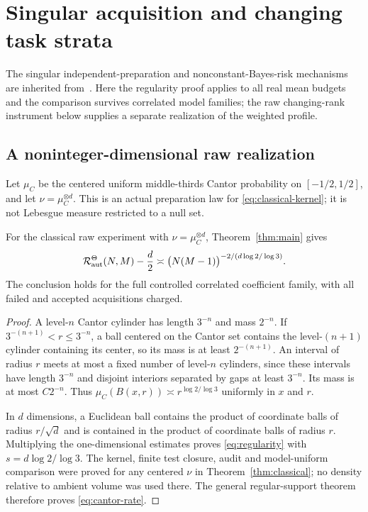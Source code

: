 \section{Singular acquisition and changing task strata}\label{sec:singular}
The singular independent-preparation and nonconstant-Bayes-risk mechanisms are inherited from~\cite{GTFStopped}. Here the regularity proof applies to all real mean budgets and the comparison survives correlated model families; the raw changing-rank instrument below supplies a separate realization of the weighted profile.
\subsection{A noninteger-dimensional raw realization}
Let $\mu_C$ be the centered uniform middle-thirds Cantor probability on $[-1/2,1/2]$, and let $\nu=\mu_C^{\otimes d}$. This is an actual preparation law for \eqref{eq:classical-kernel}; it is not Lebesgue measure restricted to a null set.

\begin{proposition}\label{prop:cantor}
For the classical raw experiment with $\nu=\mu_C^{\otimes d}$, Theorem~\ref{thm:main} gives
\begin{equation}\label{eq:cantor-rate}
 \mathcal R_{\mathrm{aut}}^\Theta(N,M)-\frac d2
 \asymp \bigl(N(M-1)\bigr)^{-2/(d\log2/\log3)}.
\end{equation}
The conclusion holds for the full controlled correlated coefficient family, with all failed and accepted acquisitions charged.
\end{proposition}
\begin{proof}
A level-$n$ Cantor cylinder has length $3^{-n}$ and mass $2^{-n}$. If $3^{-(n+1)}<r\le3^{-n}$, a ball centered on the Cantor set contains the level-$(n+1)$ cylinder containing its center, so its mass is at least $2^{-(n+1)}$. An interval of radius $r$ meets at most a fixed number of level-$n$ cylinders, since these intervals have length $3^{-n}$ and disjoint interiors separated by gaps at least $3^{-n}$. Its mass is at most $C2^{-n}$. Thus $\mu_C(B(x,r))\asymp r^{\log2/\log3}$ uniformly in $x$ and $r$.

In $d$ dimensions, a Euclidean ball contains the product of coordinate balls of radius $r/\sqrt d$ and is contained in the product of coordinate balls of radius $r$. Multiplying the one-dimensional estimates proves \eqref{eq:regularity} with $s=d\log2/\log3$. The kernel, finite test closure, audit and model-uniform comparison were proved for any centered $\nu$ in Theorem~\ref{thm:classical}; no density relative to ambient volume was used there. The general regular-support theorem therefore proves \eqref{eq:cantor-rate}.
\end{proof}

